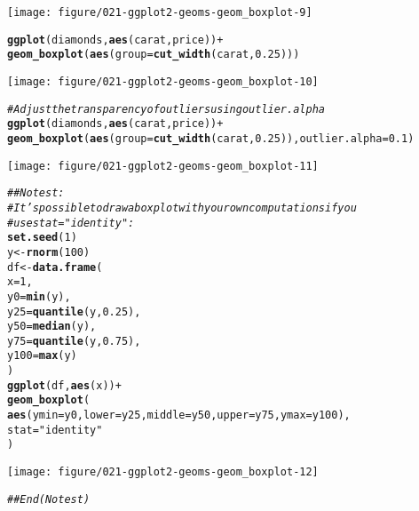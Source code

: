 \documentclass[a4paper,titlepage]{tufte-handout}\usepackage[]{graphicx}\usepackage[]{xcolor}
\makeatletter
\def\maxwidth{ %
  \ifdim\Gin@nat@width>\linewidth
    \linewidth
  \else
    \Gin@nat@width
  \fi
}
\newcommand{\hlnum}[1]{\textcolor[rgb]{0.686,0.059,0.569}{#1}}%
\newcommand{\hlsng}[1]{\textcolor[rgb]{0.192,0.494,0.8}{#1}}%
\newcommand{\hlcom}[1]{\textcolor[rgb]{0.678,0.584,0.686}{\textit{#1}}}%
\newcommand{\hlopt}[1]{\textcolor[rgb]{0,0,0}{#1}}%
\newcommand{\hldef}[1]{\textcolor[rgb]{0.345,0.345,0.345}{#1}}%
\newcommand{\hlkwb}[1]{\textcolor[rgb]{0.69,0.353,0.396}{#1}}%
\newcommand{\hlkwc}[1]{\textcolor[rgb]{0.333,0.667,0.333}{#1}}%
\newcommand{\hlkwd}[1]{\textcolor[rgb]{0.737,0.353,0.396}{\textbf{#1}}}%
\newenvironment{kframe}{%
 \def\at@end@of@kframe{}%
 \ifinner\ifhmode%
  \def\at@end@of@kframe{\end{minipage}}%
  \begin{minipage}{\columnwidth}%
 \fi\fi%
 \def\FrameCommand##1{\hskip\@totalleftmargin \hskip-\fboxsep
 \colorbox{shadecolor}{##1}\hskip-\fboxsep
     \hskip-\linewidth \hskip-\@totalleftmargin \hskip\columnwidth}%
 \MakeFramed {\advance\hsize-\width
   \@totalleftmargin\z@ \linewidth\hsize
   \@setminipage}}%
 {\par\unskip\endMakeFramed%
 \at@end@of@kframe}
\newenvironment{knitrout}{}{} %
\makeatother
\begin{document}
\begin{knitrout}
\begin{kframe}
{\ttfamily\noindent\color{warningcolor}{\#\# Warning: Continuous x aesthetic\\\#\# i did you forget `aes(group = ...)`?}}\end{kframe}
\texttt{[image: figure/021-ggplot2-geoms-geom\_boxplot-9]} 
\begin{kframe}\begin{alltt}
\hlkwd{ggplot}\hldef{(diamonds,} \hlkwd{aes}\hldef{(carat, price))} \hlopt{+}
  \hlkwd{geom_boxplot}\hldef{(}\hlkwd{aes}\hldef{(}\hlkwc{group} \hldef{=} \hlkwd{cut_width}\hldef{(carat,} \hlnum{0.25}\hldef{)))}
\end{alltt}
\end{kframe}
\texttt{[image: figure/021-ggplot2-geoms-geom\_boxplot-10]} 
\begin{kframe}\begin{alltt}
\hlcom{# Adjust the transparency of outliers using outlier.alpha}
\hlkwd{ggplot}\hldef{(diamonds,} \hlkwd{aes}\hldef{(carat, price))} \hlopt{+}
  \hlkwd{geom_boxplot}\hldef{(}\hlkwd{aes}\hldef{(}\hlkwc{group} \hldef{=} \hlkwd{cut_width}\hldef{(carat,} \hlnum{0.25}\hldef{)),} \hlkwc{outlier.alpha} \hldef{=} \hlnum{0.1}\hldef{)}
\end{alltt}
\end{kframe}
\texttt{[image: figure/021-ggplot2-geoms-geom\_boxplot-11]} 
\begin{kframe}\begin{alltt}
\hlcom{## No test: }
\hlcom{# It's possible to draw a boxplot with your own computations if you}
\hlcom{# use stat = "identity":}
\hlkwd{set.seed}\hldef{(}\hlnum{1}\hldef{)}
\hldef{y} \hlkwb{<-} \hlkwd{rnorm}\hldef{(}\hlnum{100}\hldef{)}
\hldef{df} \hlkwb{<-} \hlkwd{data.frame}\hldef{(}
  \hlkwc{x} \hldef{=} \hlnum{1}\hldef{,}
  \hlkwc{y0} \hldef{=} \hlkwd{min}\hldef{(y),}
  \hlkwc{y25} \hldef{=} \hlkwd{quantile}\hldef{(y,} \hlnum{0.25}\hldef{),}
  \hlkwc{y50} \hldef{=} \hlkwd{median}\hldef{(y),}
  \hlkwc{y75} \hldef{=} \hlkwd{quantile}\hldef{(y,} \hlnum{0.75}\hldef{),}
  \hlkwc{y100} \hldef{=} \hlkwd{max}\hldef{(y)}
\hldef{)}
\hlkwd{ggplot}\hldef{(df,} \hlkwd{aes}\hldef{(x))} \hlopt{+}
  \hlkwd{geom_boxplot}\hldef{(}
   \hlkwd{aes}\hldef{(}\hlkwc{ymin} \hldef{= y0,} \hlkwc{lower} \hldef{= y25,} \hlkwc{middle} \hldef{= y50,} \hlkwc{upper} \hldef{= y75,} \hlkwc{ymax} \hldef{= y100),}
   \hlkwc{stat} \hldef{=} \hlsng{"identity"}
 \hldef{)}
\end{alltt}
\end{kframe}
\texttt{[image: figure/021-ggplot2-geoms-geom\_boxplot-12]} 
\begin{kframe}\begin{alltt}
\hlcom{## End(No test)}
\end{alltt}
\end{kframe}
\end{knitrout}
\end{document}
